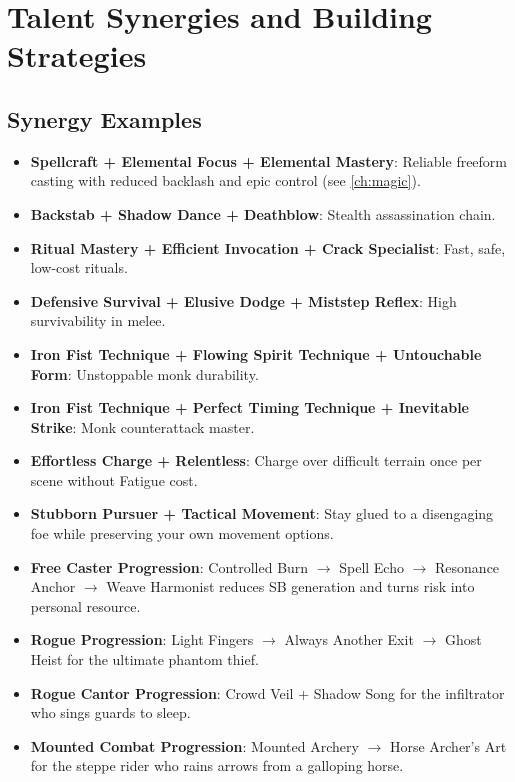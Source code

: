 {\section{Talent Synergies and Building Strategies}
\label{sec:talent-synergies}

\subsection*{Synergy Examples}
\label{sec:synergy-examples}
\begin{itemize}
  \item \textbf{Spellcraft + Elemental Focus + Elemental Mastery}: Reliable freeform casting with reduced backlash and epic control (see \ref{ch:magic}).
  \item \textbf{Backstab + Shadow Dance + Deathblow}: Stealth assassination chain.
  \item \textbf{Ritual Mastery + Efficient Invocation + Crack Specialist}: Fast, safe, low-cost rituals.
  \item \textbf{Defensive Survival + Elusive Dodge + Miststep Reflex}: High survivability in melee.
  \item \textbf{Iron Fist Technique + Flowing Spirit Technique + Untouchable Form}: Unstoppable monk durability.
  \item \textbf{Iron Fist Technique + Perfect Timing Technique + Inevitable Strike}: Monk counterattack master.
  \item \textbf{Effortless Charge + Relentless}: Charge over difficult terrain once per scene without Fatigue cost.
  \item \textbf{Stubborn Pursuer + Tactical Movement}: Stay glued to a disengaging foe while preserving your own movement options.
  \item \textbf{Free Caster Progression}: Controlled Burn $\rightarrow$ Spell Echo $\rightarrow$ Resonance Anchor $\rightarrow$ Weave Harmonist reduces SB generation and turns risk into personal resource.
  \item \textbf{Rogue Progression}: Light Fingers $\rightarrow$ Always Another Exit $\rightarrow$ Ghost Heist for the ultimate phantom thief.
  \item \textbf{Rogue Cantor Progression}: Crowd Veil + Shadow Song for the infiltrator who sings guards to sleep.
  \item \textbf{Mounted Combat Progression}: Mounted Archery $\rightarrow$ Horse Archer's Art for the steppe rider who rains arrows from a galloping horse.

\end{itemize}}
